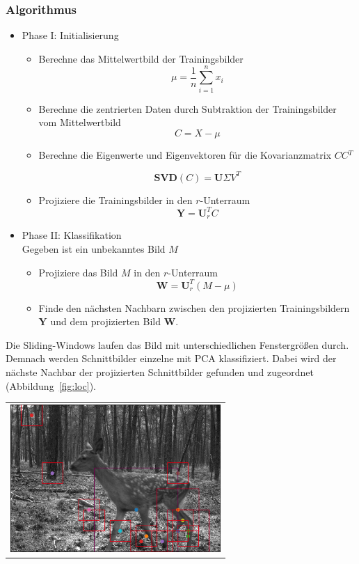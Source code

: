 \subsubsection{Algorithmus}
\begin{itemize}
\item{Phase I: Initialisierung}
\begin{itemize}
\item{Berechne das Mittelwertbild der Trainingsbilder}
\begin{equation}
\mu = \frac{1}{n}\sum^n_{i=1}{x_i} 
\end{equation}
\item{Berechne die zentrierten Daten durch Subtraktion der Trainingsbilder vom Mittelwertbild}
\begin{equation}
C = X - \mu
\end{equation}
\item{Berechne die Eigenwerte und Eigenvektoren für die Kovarianzmatrix $CC$$^T$}

\begin{equation}
\mathbf{SVD}(C) =\mathbf{U} \Sigma V^T 
\end{equation}
\item{Projiziere die Trainingsbilder in den $r$-Unterraum}
\begin{equation}
\mathbf{Y}=\mathbf{U}^{T}_{r}C
\end{equation}
\end{itemize}
\item{Phase II: Klassifikation}\\
Gegeben ist ein unbekanntes Bild  $M$
\begin{itemize}
\item{Projiziere das Bild $M$ in den $r$-Unterraum}
\begin{equation}
\mathbf{W}=\mathbf{U}^{T}_{r} (M - \mu)
\end{equation}
\item{Finde den nächsten Nachbarn zwischen den projizierten Trainingsbildern $\mathbf{Y}$ und dem projizierten Bild $\mathbf{W}$}.
\end{itemize}
\end{itemize}
Die Sliding-Windows laufen das Bild mit unterschiedlichen Fenstergrößen durch. Demnach werden Schnittbilder einzelne mit PCA klassifiziert. Dabei wird der nächste Nachbar der projizierten Schnittbilder gefunden und zugeordnet (Abbildung~\ref{fig:loc}).

\begin{center}
\begin{tabular}{c}
\includegraphics[width=8cm]{img/Segmentierung/localisation}
\end{tabular}
\label{fig:loc}
\end{center}
